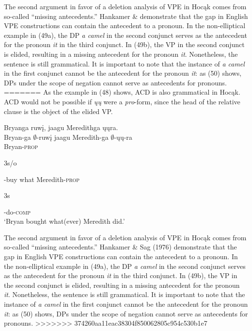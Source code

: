 \documentclass[output=paper]{LSP/langsci}
\begin{document}
The second argument in favor of a deletion analysis of VPE in Hocąk comes from so-called ``missing antecedents.'' Hankamer \& \citet{Sag1976} demonstrate that the gap in English VPE constructions can contain the antecedent to a pronoun. In the non-elliptical example in (49a), the DP \emph{a camel} in the second conjunct serves as the antecedent for the pronoun \emph{it} in the third conjunct. In (49b), the VP in the second conjunct is elided, resulting in a missing antecedent for the pronoun \emph{it}. Nonetheless, the sentence is still grammatical. It is important to note that the instance of \emph{a camel} in the first conjunct cannot be the antecedent for the pronoun \emph{it}: as (50) shows, DPs under the scope of negation cannot serve as antecedents for pronouns.
=======
As the example in (48) shows, ACD is also grammatical in Hoc\k{a}k. ACD would not be possible if \emph{\k{u}\k{u}} were a \emph{pro}-form, since the head of the relative clause is the object of the elided VP.

\begin{exe}
\ex
\glll Bryanga ruw\k{i}, jaagu Meredithga \k{u}\k{u}ra.\\
Bryan-ga $\emptyset$-ruw\k{i} jaagu Meredith-ga $\emptyset$-\k{u}\k{u}-ra\\
Bryan-\textsc{prop} \begin{sc}3s/o\end{sc}-buy what Meredith-\textsc{prop} \begin{sc}3s\end{sc}-do-\textsc{comp}\\
\trans `Bryan bought what(ever) Meredith did.'
\end{exe}

The second argument in favor of a deletion analysis of VPE in Hoc\k{a}k comes from so-called ``missing antecedents.'' Hankamer \& Sag (1976) demonstrate that the gap in English VPE constructions can contain the antecedent to a pronoun. In the non-elliptical example in (49a), the DP \emph{a camel} in the second conjunct serves as the antecedent for the pronoun \emph{it} in the third conjunct. In (49b), the VP in the second conjunct is elided, resulting in a missing antecedent for the pronoun \emph{it}. Nonetheless, the sentence is still grammatical. It is important to note that the instance of \emph{a camel} in the first conjunct cannot be the antecedent for the pronoun \emph{it}: as (50) shows, DPs under the scope of negation cannot serve as antecedents for pronouns.
>>>>>>> 374260aa11eac38304f850062805c954c530b1e7
\end{document}
